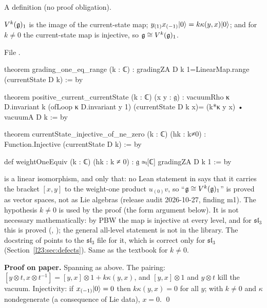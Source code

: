 \begin{status}
A definition (no proof obligation).
\end{status}

\begin{theorem}\label{l23:thm:weightone}
$V^k(\mathfrak g)_1$ is the image of the current-state map; $y_{(1)}x_{(-1)}|0\rangle=k\kappa(y,x)|0\rangle$; and for $k\ne0$ the
current-state map is injective, so $\mathfrak g\cong V^k(\mathfrak g)_1$.
\end{theorem}
\noindent File .
\begin{leancode}
theorem grading_one_eq_range (k : ℂ) : gradingZA D k 1=LinearMap.range (currentState D k) := by

theorem positive_current_currentState (k : ℂ) (x y : 𝔤) :
    vacuumRho κ D.invariant k (ofLoop κ D.invariant y 1) (currentState D k x)=
      (k*κ y x) • vacuumA D k := by

theorem currentState_injective_of_ne_zero (k : ℂ) (hk : k≠0) :
    Function.Injective (currentState D k) := by

def weightOneEquiv (k : ℂ) (hk : k ≠ 0) : 𝔤 ≃ₗ[ℂ] gradingZA D k 1 := by
\end{leancode}

\begin{dictionary}
 is a linear isomorphism, and only that: no Lean statement in  says that it carries the
bracket $[x,y]$ to the weight-one product $u_{(0)}v$, so ``$\mathfrak g\cong V^k(\mathfrak g)_1$'' is proved as vector spaces, not as Lie
algebras (release audit 2026-10-27, finding m1). The hypothesis $k\ne0$ is used by the proof (the form argument below). It is not
necessary mathematically: by PBW the map is injective at every level, and for $\mathfrak{sl}_3$ this is proved
(, ); the general all-level statement is not in the library. The docstring of
 points to the $\mathfrak{sl}_3$ file for it, which is correct only for $\mathfrak{sl}_3$
(Section~\ref{l23:sec:defects}). Same as the textbook for $k\ne0$.
\end{dictionary}

\textbf{Proof on paper.} Spanning as above. The pairing: $[y\otimes t,x\otimes t^{-1}]=[y,x]\otimes1+k\kappa(y,x)$, and
$[y,x]\otimes1$ and $y\otimes t$ kill the vacuum. Injectivity: if $x_{(-1)}|0\rangle=0$ then $k\kappa(y,x)=0$ for all $y$;
with $k\ne0$ and $\kappa$ nondegenerate (a consequence of Lie data), $x=0$. \qed

